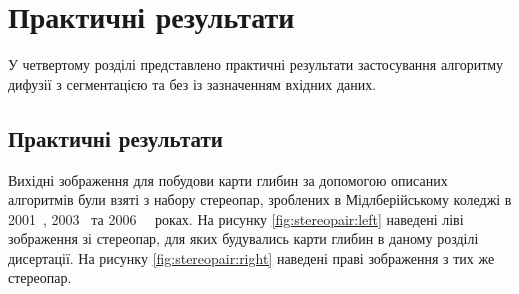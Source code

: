 \chapter{Практичні результати}

У четвертому розділі представлено практичні результати
застосування алгоритму дифузії з сегментацією
та без із зазначенням вхідних даних.

\section{Практичні результати}

Вихідні зображення для побудови карти глибин
за допомогою описаних алгоритмів були взяті з набору стереопар,
зроблених в Мідлберійському коледжі в 2001~\cite{middlebury:ds:2001},
2003~\cite{middlebury:ds:2003}
та 2006~\cite{middlebury:ds:2006:1}~\cite{middlebury:ds:2006:2} роках.
На рисунку \ref{fig:stereopair:left} наведені ліві зображення зі стереопар,
для яких будувались карти глибин в даному розділі дисертації.
На рисунку \ref{fig:stereopair:right}
наведені праві зображення з тих же стереопар.


